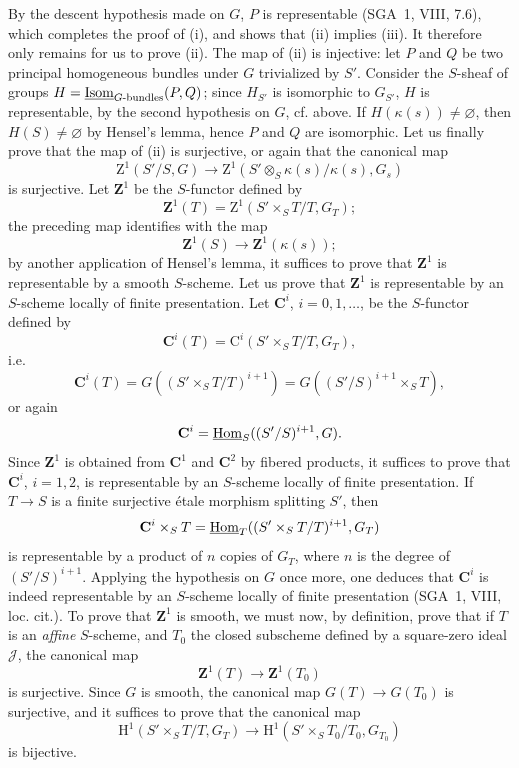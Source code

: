 By the descent hypothesis made on $G$, $P$ is representable (SGA~1, VIII, 7.6), which completes the proof of (i), and shows that (ii) implies (iii). It therefore only remains for us to prove (ii).
\label{XXIV.8.1.3}
The map of (ii) is injective: let $P$ and $Q$ be two principal homogeneous bundles under $G$ trivialized by $S'$. Consider the $S$-sheaf of groups $H=\underline{\operatorname{Isom}}_{G\text{-bundles}}(P,Q)$; since $H_{S'}$ is isomorphic to $G_{S'}$, $H$ is representable, by the second hypothesis on $G$, cf. above. If $H(\kappa(s))\ne\varnothing$, then $H(S)\ne\varnothing$ by Hensel's lemma, hence $P$ and $Q$ are isomorphic.
\label{XXIV.8.1.4}
Let us finally prove that the map of (ii) is surjective, or again that the canonical map
\[
\mathrm Z^1(S'/S,G)\to\mathrm Z^1(S'\otimes_S\kappa(s)/\kappa(s),G_s)
\]
is surjective. Let $\mathbf Z^1$ be the $S$-functor defined by
\[
\mathbf Z^1(T)=\mathrm Z^1(S'\times_S T/T,G_T);
\]
the preceding map identifies with the map
\[
\mathbf Z^1(S)\to\mathbf Z^1(\kappa(s));
\]
by another application of Hensel's lemma, it suffices to prove that $\mathbf Z^1$ is representable by a smooth $S$-scheme.
\label{XXIV.8.1.5}
Let us prove that $\mathbf Z^1$ is representable by an $S$-scheme locally of finite presentation. Let $\mathbf C^i$, $i=0,1,\ldots$, be the $S$-functor defined by
\[
\mathbf C^i(T)=\mathrm C^i(S'\times_S T/T,G_T),
\]
i.e.
\[
\mathbf C^i(T)=G((S'\times_S T/T)^{i+1})=G((S'/S)^{i+1}\times_S T),
\]
or again
\[
\mathbf C^i=\underline{\operatorname{Hom}}_S((S'/S)^{i+1},G).
\]
Since $\mathbf Z^1$ is obtained from $\mathbf C^1$ and $\mathbf C^2$ by fibered products, it suffices to prove that $\mathbf C^i$, $i=1,2$, is representable by an $S$-scheme locally of finite presentation.
\label{XXIV.8.1.6}
If $T\to S$ is a finite surjective étale morphism splitting $S'$, then
\[
\mathbf C^i\times_S T=\underline{\operatorname{Hom}}_T((S'\times_S T/T)^{i+1},G_T)
\]
is representable by a product of $n$ copies of $G_T$, where $n$ is the degree of $(S'/S)^{i+1}$. Applying the hypothesis on $G$ once more, one deduces that $\mathbf C^i$ is indeed representable by an $S$-scheme locally of finite presentation (SGA~1, VIII, loc. cit.).
\label{XXIV.8.1.7}
To prove that $\mathbf Z^1$ is smooth, we must now, by definition, prove that if $T$ is an \emph{affine} $S$-scheme, and $T_0$ the closed subscheme defined by a square-zero ideal $\mathscr J$, the canonical map
\[
\mathbf Z^1(T)\to\mathbf Z^1(T_0)
\]
is surjective. Since $G$ is smooth, the canonical map $G(T)\to G(T_0)$ is surjective, and it suffices to prove that the canonical map
\[
\mathrm H^1(S'\times_S T/T,G_T)\to\mathrm H^1(S'\times_S T_0/T_0,G_{T_0})
\]
is bijective.

